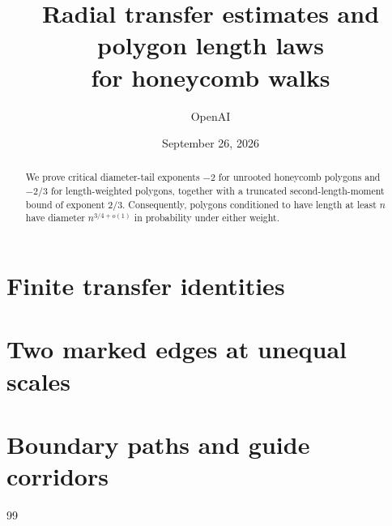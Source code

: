 \documentclass[11pt]{article}
\title{Radial transfer estimates and polygon length laws\\for honeycomb walks}
\author{OpenAI}
\date{September 26, 2026}
\numberwithin{equation}{section}
\theoremstyle{definition}
\theoremstyle{remark}
\begin{document}
\maketitle
\begin{abstract}
We prove critical diameter-tail exponents $-2$ for unrooted honeycomb polygons and $-2/3$ for length-weighted polygons, together with a truncated second-length-moment bound of exponent $2/3$. Consequently, polygons conditioned to have length at least $n$ have diameter $n^{3/4+o(1)}$ in probability under either weight.
\end{abstract}
\tableofcontents

\section{Finite transfer identities}\label{sec:finite}







\section{Two marked edges at unequal scales}\label{sec:two-marks}










\section{Boundary paths and guide corridors}\label{sec:boundary}

\begin{thebibliography}{99}
\small
\setlength{\itemsep}{2pt}

\end{thebibliography}
\end{document}
